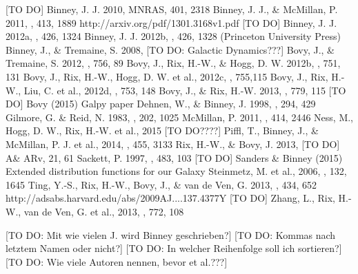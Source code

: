 \documentclass[12pt,preprint]{aastex}
\begin{document}
\begin{thebibliography}{}
 [TO DO]
 Binney, J. J. 2010, MNRAS, 401, 2318
 Binney, J. J., \& McMillan, P. 2011, \mnras, 413, 1889
 http://arxiv.org/pdf/1301.3168v1.pdf [TO DO]
 Binney, J. J. 2012a, \mnras, 426, 1324
 Binney, J. J. 2012b, \mnras, 426, 1328 (Princeton University Press)
 Binney, J., \& Tremaine, S. 2008, [TO DO: Galactic Dynamics???]
 Bovy, J., \& Tremaine, S. 2012, \apj, 756, 89
 Bovy, J., Rix, H.-W., \& Hogg, D. W. 2012b, \apj, 751, 131
 Bovy, J., Rix, H.-W., Hogg, D. W. et al., 2012c, \apj, 755,115
 Bovy, J., Rix, H.-W., Liu, C. et al., 2012d, \apj, 753, 148
  Bovy, J., \& Rix, H.-W. 2013, \apj, 779, 115
 [TO DO] Bovy (2015) Galpy paper
 Dehnen, W., \& Binney, J. 1998, \mnras, 294, 429
 Gilmore, G. \& Reid, N. 1983, \mnras, 202, 1025
 McMillan, P. 2011, \mnras, 414, 2446
 Ness, M., Hogg, D. W., Rix, H.-W. et al., 2015 [TO DO????]
 Piffl, T., Binney, J., \& McMillan, P. J. et al., 2014, \mnras, 455, 3133
 Rix, H.-W., \& Bovy, J. 2013, [TO DO] A\& ARv, 21, 61
 Sackett, P. 1997, \apj, 483, 103
 [TO DO] Sanders \& Binney (2015) Extended distribution functions for our Galaxy
 Steinmetz, M. et al., 2006, \aj, 132, 1645
 Ting, Y.-S., Rix, H.-W., Bovy, J., \& van de Ven, G. 2013, \mnras, 434, 652
 http://adsabs.harvard.edu/abs/2009AJ....137.4377Y [TO DO]
 Zhang, L., Rix, H.-W., van de Ven, G. et al., 2013, \apj, 772, 108
\end{thebibliography}

[TO DO: Mit wie vielen J. wird Binney geschrieben?] [TO DO: Kommas nach letztem Namen oder nicht?] [TO DO: In welcher Reihenfolge soll ich sortieren?] [TO DO: Wie viele Autoren nennen, bevor et al.???]
\end{document}
